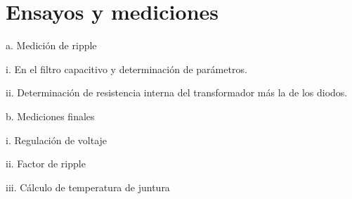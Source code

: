 \chapter{Ensayos y mediciones}

a. Medición de ripple

i. En el filtro capacitivo y determinación de parámetros.

ii. Determinación de resistencia interna del transformador más la de los
diodos.

b. Mediciones finales

i. Regulación de voltaje

ii. Factor de ripple

iii. Cálculo de temperatura de juntura
